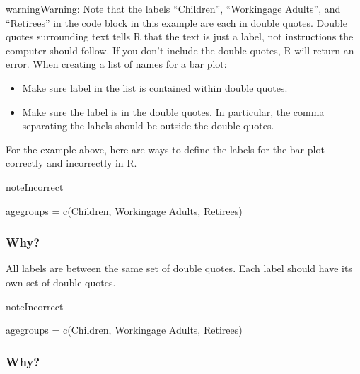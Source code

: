 \documentclass[letterpaper,10pt,english]{jupyterBook}
\begin{document}
\begin{sphinxadmonition}{warning}{Warning:}
\sphinxAtStartPar
Note that the labels “Children”, “Working\sphinxhyphen{}age Adults”, and “Retirees” in the code block in this example are each in double quotes. Double quotes surrounding text tells R that the text is just a label, not instructions the computer should follow. If you don’t include the double quotes, R will return an error. When creating a list of names for a bar plot:
\begin{itemize}
\item {} 
\sphinxAtStartPar
Make sure  label in the list is contained within double quotes.

\item {} 
\sphinxAtStartPar
Make sure  the label is in the double quotes. In particular, the comma separating the labels should be outside the double quotes.

\end{itemize}

\sphinxAtStartPar
For the example above, here are ways to define the labels for the bar plot correctly and incorrectly in R.

\begin{sphinxadmonition}{note}{Incorrect}

\begin{sphinxVerbatim}[commandchars=\\\{\}]
age\PYGZus{}groups = c(\PYGZdq{}Children, Working\PYGZhy{}age Adults, Retirees\PYGZdq{})
\end{sphinxVerbatim}
\subsubsection*{Why?}

\sphinxAtStartPar
All labels are between the same set of double quotes. Each label should have its own set of double quotes.
\end{sphinxadmonition}

\begin{sphinxadmonition}{note}{Incorrect}

\begin{sphinxVerbatim}[commandchars=\\\{\}]
age\PYGZus{}groups = c(\PYGZdq{}Children,\PYGZdq{} \PYGZdq{}Working\PYGZhy{}age Adults,\PYGZdq{} \PYGZdq{}Retirees\PYGZdq{})
\end{sphinxVerbatim}
\subsubsection*{Why?}


\end{sphinxadmonition}
\end{sphinxadmonition}
\end{document}
